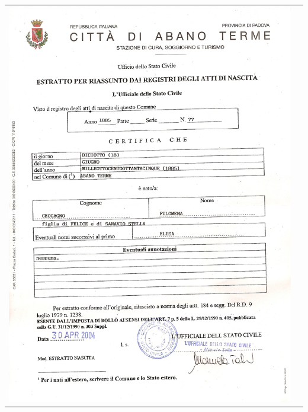 \documentclass[a4paper,10pt]{book}
\begin{document}
\begin{tabular}{ c c }
  \includegraphics[height=0.35\textheight]{../img/05-filomena.png}\label{fig:05-filomena}
  & 

\end{tabular}
\end{document}
